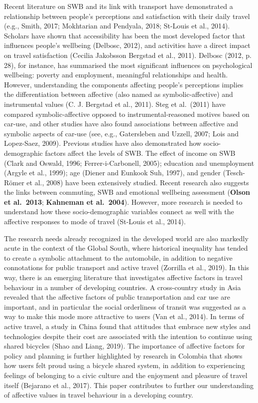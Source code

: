 \documentclass[]{elsarticle} %
\begin{document}
Recent literature on SWB and its link with transport have demonstrated a
relationship between people's perceptions and satisfaction with their
daily travel (e.g., Smith, 2017; Mokhtarian and Pendyala, 2018; St-Louis
et al., 2014). Scholars have shown that accessibility has been the most
developed factor that influences people's wellbeing (Delbosc, 2012), and
activities have a direct impact on travel satisfaction (Cecilia
Jakobsson Bergstad et al., 2011). Delbosc (2012, p. 28), for instance,
has summarised the most significant influences on psychological
wellbeing: poverty and employment, meaningful relationships and health.
However, understanding the components affecting people's perceptions
implies the differentiation between affective (also named as
symbolic-affective) and instrumental values (C. J. Bergstad et al.,
2011). Steg et al.~(2011) have compared symbolic-affective opposed to
instrumental-reasoned motives based on car-use, and other studies have
also found associations between affective and symbolic aspects of
car-use (see, e.g., Gatersleben and Uzzell, 2007; Lois and Lopez-Saez,
2009). Previous studies have also demonstrated how socio-demographic
factors affect the levels of SWB. The effect of income on SWB (Clark and
Oswald, 1996; Ferrer-i-Carbonell, 2005); education and unemployment
(Argyle et al., 1999); age (Diener and Eunkook Suh, 1997), and gender
(Tesch-Römer et al., 2008) have been extensively studied. Recent
research also suggests the links between commuting, SWB and emotional
wellbeing assessment (\textbf{Olson et al.~2013}; \textbf{Kahneman et
al.~2004}). However, more research is needed to understand how these
socio-demographic variables connect as well with the affective responses
to mode of travel (St-Louis et al., 2014).

The research needs already recognized in the developed world are also
markedly acute in the context of the Global South, where historical
inequality has tended to create a symbolic attachment to the automobile,
in addition to negative connotations for public transport and active
travel (Zorrilla et al., 2019). In this way, there is an emerging
literature that investigates affective factors in travel behaviour in a
number of developing countries. A cross-country study in Asia revealed
that the affective factors of public transportation and car use are
important, and in particular the social orderliness of transit was
suggested as a way to make this mode more attractive to users (Van et
al., 2014). In terms of active travel, a study in China found that
attitudes that embrace new styles and technologies despite their cost
are associated with the intention to continue using shared bicycles
(Shao and Liang, 2019). The importance of affective factors for policy
and planning is further highlighted by research in Colombia that shows
how users felt proud using a bicycle shared system, in addition to
experiencing feelings of belonging to a civic culture and the enjoyment
and pleasure of travel itself (Bejarano et al., 2017). This paper
contributes to further our understanding of affective values in travel
behaviour in a developing country.
\end{document}
